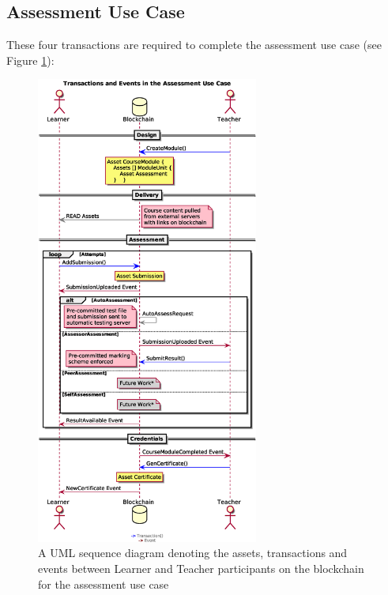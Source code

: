 \subsection{Assessment Use Case}

These four transactions are required to complete the assessment use case (see Figure \ref{fig:assessmentloop}):

\begin{figure}[!ht]
	\centering
	\includegraphics[width=0.65\textwidth]{assessmentloop}
	\caption[Assessment Use Case]
	{A UML sequence diagram denoting the assets, transactions and events between
		Learner and Teacher participants on the blockchain for the assessment use case}
	\label{fig:assessmentloop}
\end{figure}


